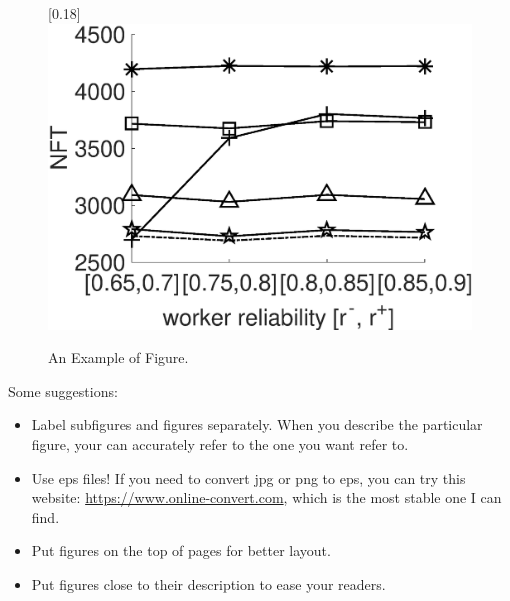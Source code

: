 \begin{figure}[th!]
{		\scalebox{0.18}[0.18]{\includegraphics{../figures/example.eps}}
		\label{subfig:sub_example7}}
	\figureCaptionMargin
	\caption{\small An Example of Figure.}\figureBelowMargin\vspace{-2ex}
	\label{fig:example3}
\end{figure}

Some suggestions:
\begin{itemize}[leftmargin=*]
	\item Label subfigures and figures separately. When you describe the particular figure, your can accurately refer to the one you want refer to.
	\item Use eps files! If you need to convert jpg or png to eps, you can try this website: \url{https://www.online-convert.com}, which is the most stable one I can find.
	\item Put figures on the top of pages for better layout. 
	\item Put figures close to their description to ease your readers.
\end{itemize}